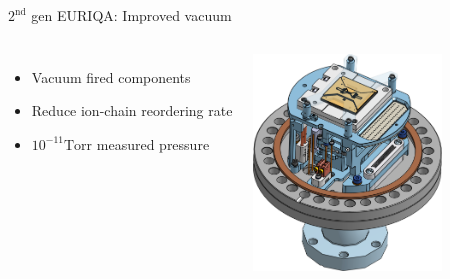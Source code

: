 \documentclass{beamer}
\begin{document}

\begin{frame}{$2^{\text{nd}}$ gen EURIQA: Improved vacuum}
  \begin{center}
    \begin{columns}
      \column{6.3cm}
      \begin{itemize}
      \item Vacuum fired components
      \item<2-> Reduce ion-chain reordering rate
      \item<3-> $10^{-11} \mathrm{Torr}$ measured pressure
      \end{itemize}
      \column{5.1cm}
      \includegraphics[width=5cm]{imgs/Vacuum_stack.png}
    \end{columns}
  \end{center}
\end{frame}

\end{document}
